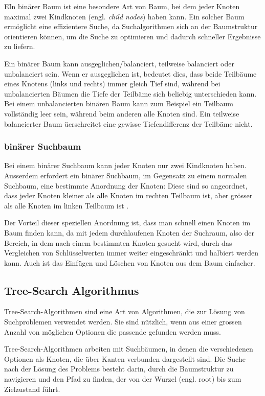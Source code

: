 \documentclass[a4paper,11pt]{article}
\begin{document}
EIn binärer Baum ist eine besondere Art von Baum, bei dem jeder Knoten maximal zwei Kindknoten (engl. \emph{child nodes}) haben kann. Ein solcher Baum ermöglicht eine effizientere Suche, da Suchalgorithmen sich an der Baumstruktur orientieren können, um die Suche zu optimieren und dadurch schneller Ergebnisse zu liefern. 

Ein binärer Baum kann ausgeglichen/balanciert, teilweise balanciert oder unbalanciert sein. Wenn er ausgeglichen ist, bedeutet dies, dass beide Teilbäume eines Knotens (links und rechts) immer gleich Tief sind, während bei unbalancierten Bäumen die Tiefe der Teilbäme sich beliebig unterschieden kann. Bei einem unbalancierten binären Baum kann zum Beispiel ein Teilbaum vollständig leer sein, während beim anderen alle Knoten sind. Ein teilweise balancierter Baum üerschreitet eine gewisse Tiefendifferenz der Teilbäme nicht.

\subsubsection{binärer Suchbaum}
Bei einem binärer Suchbaum kann jeder Knoten nur zwei Kindknoten haben. Ausserdem erfordert ein binärer Suchbaum, im Gegensatz zu einem normalen Suchbaum, eine bestimmte Anordnung der Knoten: Diese sind so angeordnet, dass jeder Knoten kleiner als alle Knoten im rechten Teilbaum ist, aber grösser als alle Knoten im linken Teilbaum ist \cite{c2_algorithms}.

Der Vorteil dieser speziellen Anordnung ist, dass man schnell einen Knoten im Baum finden kann, da mit jedem durchlaufenen Knoten der Suchraum, also der Bereich, in dem nach einem bestimmten Knoten gesucht wird, durch das Vergleichen von Schlüsselwerten immer weiter eingeschränkt und halbiert werden kann. Auch ist das Einfügen und Löschen von Knoten aus dem Baum einfacher. 

\subsection{Tree-Search Algorithmus}
Tree-Search-Algorithmen sind eine Art von Algorithmen, die zur Lösung von Suchproblemen verwendet werden. Sie sind nützlich, wenn aus einer grossen Anzahl von möglichen Optionen die passende gefunden werden muss.

Tree-Search-Algorithmen arbeiten mit Suchbäumen, in denen die verschiedenen Optionen als Knoten, die über Kanten verbunden dargestellt sind. Die Suche nach der Lösung des Problems besteht darin, durch die Baumstruktur zu navigieren und den Pfad zu finden, der von der Wurzel (engl. root) bis zum Zielzustand führt.
\end{document}
